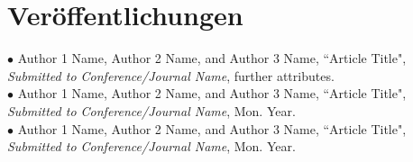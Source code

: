 \section*{Veröffentlichungen}

$\bullet$ Author 1 Name, Author 2 Name, and Author 3 Name, {``Article Title"}, \emph{Submitted to Conference/Journal Name}, further attributes.\\
$\bullet$ Author 1 Name, Author 2 Name, and Author 3 Name, {``Article Title"}, \emph{Submitted to Conference/Journal Name}, Mon. Year. \\
$\bullet$ Author 1 Name, Author 2 Name, and Author 3 Name, {``Article Title"}, \emph{Submitted to Conference/Journal Name}, Mon. Year.
